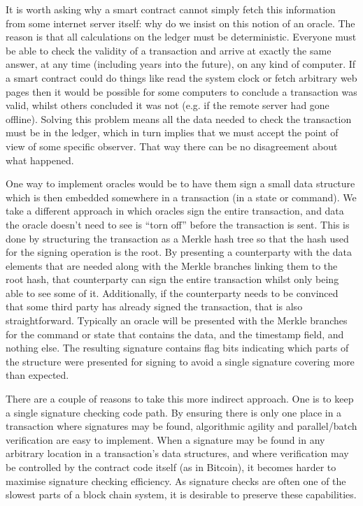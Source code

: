 \documentclass{article}
\begin{document}
It is worth asking why a smart contract cannot simply fetch this information from some internet server itself: why
do we insist on this notion of an oracle. The reason is that all calculations on the ledger must be deterministic.
Everyone must be able to check the validity of a transaction and arrive at exactly the same answer, at any time (including years into the future),
on any kind of computer. If a smart contract could do things like read the system clock or fetch arbitrary web pages
then it would be possible for some computers to conclude a transaction was valid, whilst others concluded it was
not (e.g. if the remote server had gone offline). Solving this problem means all the data needed to check the
transaction must be in the ledger, which in turn implies that we must accept the point of view of some specific
observer. That way there can be no disagreement about what happened.

One way to implement oracles would be to have them sign a small data structure which is then embedded somewhere
in a transaction (in a state or command). We take a different approach in which oracles sign the entire transaction,
and data the oracle doesn't need to see is ``torn off'' before the transaction is sent. This is done by structuring
the transaction as a Merkle hash tree so that the hash used for the signing operation is the root. By presenting a
counterparty with the data elements that are needed along with the Merkle branches linking them to the root hash,
that counterparty can sign the entire transaction whilst only being able to see some of it. Additionally, if the
counterparty needs to be convinced that some third party has already signed the transaction, that is also
straightforward. Typically an oracle will be presented with the Merkle branches for the command or state that
contains the data, and the timestamp field, and nothing else. The resulting signature contains flag bits indicating which
parts of the structure were presented for signing to avoid a single signature covering more than expected.


There are a couple of reasons to take this more indirect approach. One is to keep a single signature checking
code path. By ensuring there is only one place in a transaction where signatures may be found, algorithmic
agility and parallel/batch verification are easy to implement. When a signature may be found in any arbitrary
location in a transaction's data structures, and where verification may be controlled by the contract code itself (as in Bitcoin),
it becomes harder to maximise signature checking efficiency. As signature checks are often one of the slowest parts
of a block chain system, it is desirable to preserve these capabilities.
\end{document}

